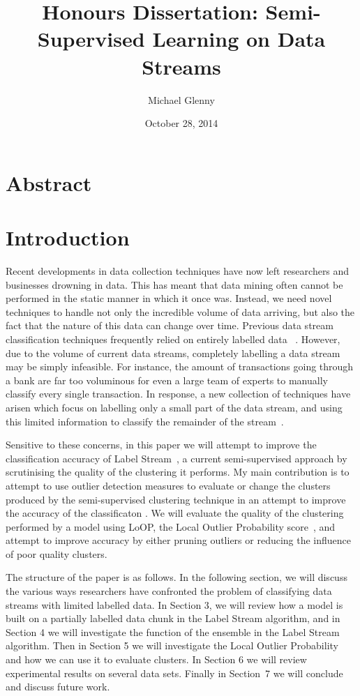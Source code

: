 \documentclass[12pt,a4paper,oneside]{report}
\begin{document}
\title{Honours Dissertation: Semi-Supervised Learning on Data Streams}
\author{Michael Glenny}
\date{October 28, 2014}
\maketitle
\section{Abstract}


\section*{Introduction}

Recent developments in data collection techniques have now left researchers and businesses drowning in data. This has meant that data mining often cannot be performed in the static manner in which it once was. Instead, we need novel techniques to handle not only the incredible volume of data arriving, but also the fact that the nature of this data can change over time. Previous data stream classification techniques frequently relied on entirely labelled data ~\cite{Incremental, Ens}. However, due to the volume of current data streams, completely labelling a data stream may be simply infeasible. For instance, the amount of transactions going through a bank are far too voluminous for even a large team of experts to manually classify every single transaction. In response, a new collection of techniques have arisen which focus on labelling only a small part of the data stream, and using this limited information to classify the remainder of the stream~\cite{LabStr,Zhang}. 

Sensitive to these concerns, in this paper we will attempt to improve the classification accuracy of Label Stream~\cite{LabStr}, a current semi-supervised approach by scrutinising the quality of the clustering it performs. My main contribution is to attempt to use outlier detection measures to evaluate or change the clusters produced by the semi-supervised clustering technique in an attempt to improve the accuracy of the classificaton . We will evaluate the quality of the clustering performed by a model using LoOP, the Local Outlier Probability score~\cite{Loop}, and attempt to improve accuracy by either pruning outliers or reducing the influence of poor quality clusters. 

The structure of the paper is as follows. In the following section, we will discuss the various ways researchers have confronted the problem of classifying data streams with limited labelled data. In Section 3, we will review how a model is built on a partially labelled data chunk in the Label Stream algorithm, and in Section 4 we will investigate the function of the ensemble in the Label Stream algorithm. Then in Section 5 we will investigate the Local Outlier Probability and how we can use it to evaluate clusters. In Section 6 we will review experimental results on several data sets. Finally in Section~7 we will conclude and discuss future work. 
\end{document}
